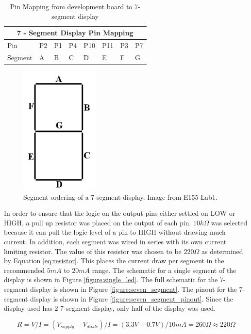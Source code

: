 \documentclass[11pt]{article}
\begin{document}
\begin{table}[h]
\center
\begin{tabular}{|l|l|l|l|l|l|l|l|}
\hline
\multicolumn{8}{|c|}{7 - Segment Display Pin Mapping} \\ \hline
Pin       & P2  & P1  & P4  & P10  & P11  & P3  & P7  \\ \hline
Segment   & A   & B   & C   & D    & E    & F   & G   \\ \hline
\end{tabular}
\caption{Pin Mapping from development board to 7-segment display}
\label{tb:pin_mapping}
\end{table}


\begin{figure}[h!]
\centering
\includegraphics[scale=0.6]{seven_segment_layout.png}
\caption{Segment ordering of a 7-segment display. Image from E155 Lab1.}
\label{figure:seven_segement_layout}
\end{figure} 


In order to ensure that the logic on the output pins either settled on LOW or HIGH, a pull up resistor was placed on the output of each pin. $10k\Omega$ was selected because it can pull the logic level of a pin to HIGH without drawing much current. In addition, each segment was wired in series with its own current limiting resistor. The value of this resistor was chosen to be $220\Omega$ as determined by Equation \ref{eq:resistor}. This places the current draw per segment in the recommended $5mA$ to $20mA$ range. The schematic for a single segment of the display is shown in Figure \ref{figure:single_led}. The full schematic for the 7-segment display is shown in Figure \ref{figure:seven_segment}. The pinout for the 7-segment display is shown in Figure \ref{figure:seven_segment_pinout}. Since the display used has 2 7-segment display, only half of the display was used.


\begin{equation}
\label{eq:resistor}
R = V/I
  = (V_{supply}-V_{diode})/I
  = (3.3V - 0.7V)/10mA
  = 260\Omega
 \approx 220\Omega
\end{equation} 
		
\end{document}
